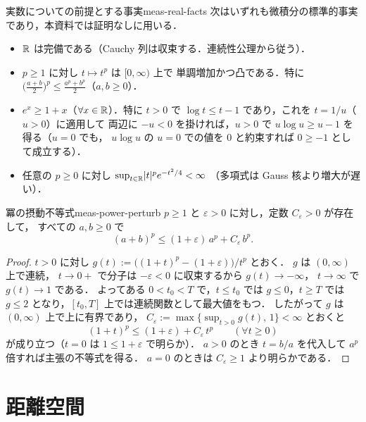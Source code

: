 \begin{remark}{実数についての前提とする事実}{meas-real-facts}
  次はいずれも微積分の標準的事実であり，本資料では証明なしに用いる．
  \begin{itemize}
    \item $\mathbb{R}$ は完備である（Cauchy 列は収束する．連続性公理から従う）．
    \item $p\geq1$ に対し $t\mapsto t^p$ は $[0,\infty)$ 上で
      単調増加かつ凸である．特に
      $\bigl(\frac{a+b}{2}\bigr)^p\leq\frac{a^p+b^p}{2}$（$a,b\geq0$）．
    \item $e^x\geq1+x$（$\forall x\in\mathbb{R}$）．特に $t>0$ で
      $\log t\leq t-1$ であり，これを $t=1/u$（$u>0$）に適用して
      両辺に $-u<0$ を掛ければ，$u>0$ で
      $u\log u\geq u-1$ を得る（$u=0$ でも，
      $u\log u$ の $u=0$ での値を $0$ と約束すれば
      $0\geq-1$ として成立する）．
    \item 任意の $p\geq0$ に対し
      $\sup_{t\in\mathbb{R}}\lvert t \rvert^pe^{-t^2/4}<\infty$
      （多項式は Gauss 核より増大が遅い）．
  \end{itemize}
\end{remark}

\begin{claim}{冪の摂動不等式}{meas-power-perturb}
  $p\geq1$ と $\varepsilon>0$ に対し，定数 $C_\varepsilon>0$ が存在して，
  すべての $a,b\geq0$ で
  \[
    (a+b)^p\leq(1+\varepsilon)\,a^p+C_\varepsilon\,b^p.
  \]
\end{claim}

\begin{proof}
  $t>0$ に対し
  $g(t):=\bigl((1+t)^p-(1+\varepsilon)\bigr)/t^p$ とおく．
  $g$ は $(0,\infty)$ 上で連続，
  $t\to0+$ で分子は $-\varepsilon<0$ に収束するから $g(t)\to-\infty$，
  $t\to\infty$ で $g(t)\to1$ である．
  よってある $0<t_0<T$ で，$t\leq t_0$ では $g\leq0$，$t\geq T$ では
  $g\leq2$ となり，$[t_0,T]$ 上では連続関数として最大値をもつ．
  したがって $g$ は $(0,\infty)$ 上で上に有界であり，
  $C_\varepsilon:=\max\{\sup_{t>0}g(t),\,1\}<\infty$ とおくと
  \[
    (1+t)^p\leq(1+\varepsilon)+C_\varepsilon\,t^p
    \qquad(\forall t\geq0)
  \]
  が成り立つ（$t=0$ は $1\leq1+\varepsilon$ で明らか）．
  $a>0$ のとき $t=b/a$ を代入して $a^p$ 倍すれば主張の不等式を得る．
  $a=0$ のときは $C_\varepsilon\geq1$ より明らかである．
\end{proof}

\section{距離空間}

